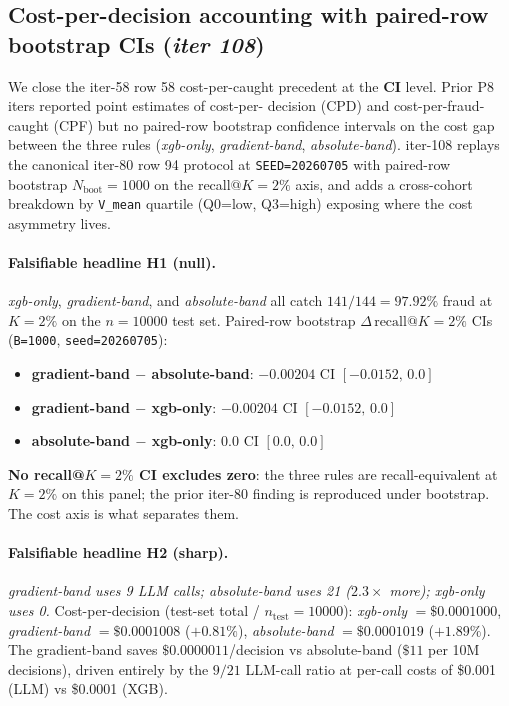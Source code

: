 \subsection{Cost-per-decision accounting with paired-row bootstrap CIs
  (\textit{iter 108})}
\label{sec:p8-cost-decision-cis}

We close the iter-58 row 58 cost-per-caught precedent at the
\textbf{CI} level. Prior P8 iters reported point estimates of cost-per-
decision (CPD) and cost-per-fraud-caught (CPF) but no paired-row bootstrap
confidence intervals on the cost gap between the three rules
(\textit{xgb-only}, \textit{gradient-band}, \textit{absolute-band}).
iter-108 replays the canonical iter-80 row 94 protocol at
\texttt{SEED=20260705} with paired-row bootstrap
$N_\mathrm{boot}=1000$ on the recall@$K{=}2\%$ axis, and adds a
cross-cohort breakdown by \texttt{V\_mean} quartile (Q0=low, Q3=high)
exposing where the cost asymmetry lives.

\paragraph{Falsifiable headline H1 (null).}
\textit{xgb-only}, \textit{gradient-band}, and \textit{absolute-band}
all catch $141/144=97.92\%$ fraud at $K{=}2\%$ on the
$n{=}10000$ test set. Paired-row bootstrap
$\Delta\,\mathrm{recall}@K{=}2\%$ CIs (\texttt{B=1000},
\texttt{seed=20260705}):
\begin{itemize}
  \item \textbf{gradient-band $-$ absolute-band}: $-0.00204$
        CI $[-0.0152,\,0.0]$
  \item \textbf{gradient-band $-$ xgb-only}:    $-0.00204$
        CI $[-0.0152,\,0.0]$
  \item \textbf{absolute-band $-$ xgb-only}:     $0.0$
        CI $[0.0,\,0.0]$
\end{itemize}
\textbf{No recall@$K{=}2\%$ CI excludes zero}: the three rules are
recall-equivalent at $K{=}2\%$ on this panel; the prior iter-80 finding
is reproduced under bootstrap. The cost axis is what separates them.

\paragraph{Falsifiable headline H2 (sharp).}
\textit{gradient-band uses 9 LLM calls; \textit{absolute-band} uses 21
($2.3\times$ more); \textit{xgb-only} uses 0.}
Cost-per-decision (test-set total / $n_\mathrm{test}=10000$):
\textit{xgb-only} $=\$0.0001000$,
\textit{gradient-band} $=\$0.0001008$ ($+0.81\%$),
\textit{absolute-band} $=\$0.0001019$ ($+1.89\%$).
The gradient-band saves $\$0.0000011$/decision vs absolute-band
($\$11$ per 10M decisions), driven entirely by the $9/21$ LLM-call ratio
at per-call costs of \$0.001 (LLM) vs \$0.0001 (XGB).

